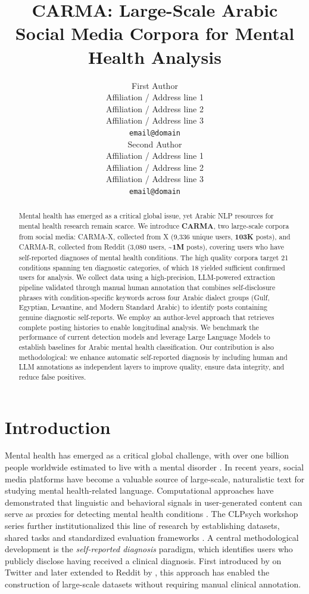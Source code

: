\documentclass[11pt]{article}
\title{CARMA: Large-Scale Arabic Social Media Corpora for Mental Health Analysis}
\author{First Author \\
  Affiliation / Address line 1 \\
  Affiliation / Address line 2 \\
  Affiliation / Address line 3 \\
  \texttt{email@domain} \\\And
  Second Author \\
  Affiliation / Address line 1 \\
  Affiliation / Address line 2 \\
  Affiliation / Address line 3 \\
  \texttt{email@domain} \\}
\begin{document}
\maketitle
\begin{abstract}
Mental health has emerged as a critical global issue, yet Arabic NLP resources for mental health research remain scarce. We introduce \textbf{CARMA}, two large-scale corpora from social media: CARMA-X, collected from X (9,336 unique users, \textbf{103K} posts), and CARMA-R, collected from Reddit (3,080 users, \textbf{\textasciitilde1M} posts), covering users who have self-reported diagnoses of mental health conditions. The high quality corpora target 21 conditions spanning ten diagnostic categories, of which 18 yielded sufficient confirmed users for analysis. We collect data using a high-precision, LLM-powered extraction pipeline validated through manual human annotation that combines self-disclosure phrases with condition-specific keywords across four Arabic dialect groups (Gulf, Egyptian, Levantine, and Modern Standard Arabic) to identify posts containing genuine diagnostic self-reports. We employ an author-level approach that retrieves complete posting histories to enable longitudinal analysis. We benchmark the performance of current detection models and leverage Large Language Models to establish baselines for Arabic mental health classification. Our contribution is also methodological: we enhance automatic self-reported diagnosis by including human and LLM annotations as independent layers to improve quality, ensure data integrity, and reduce false positives.\end{abstract}



\section{Introduction}
\label{sec:introduction}
Mental health has emerged as a critical global challenge, with over one billion
people worldwide estimated to live with a mental disorder
\cite{who2025mental}. In recent years, social media platforms have become a valuable source of
large-scale, naturalistic text for studying mental health-related language.
Computational approaches have demonstrated that linguistic and behavioral signals
in user-generated content can serve as proxies for detecting mental health
conditions \cite{de2013predicting, chancellor2020methods}. The CLPsych workshop
series further institutionalized this line of research by establishing datasets, shared tasks and standardized evaluation frameworks \cite{coppersmith2015clpsych}.
A central methodological development is the \textit{self-reported diagnosis}
paradigm, which identifies users who publicly disclose having received a clinical
diagnosis. First introduced by \citet{coppersmith2014quantifying} on Twitter and
later extended to Reddit by \citet{cohan-etal-2018-smhd}, this approach has enabled the
construction of large-scale datasets without requiring manual clinical annotation.
\end{document}
